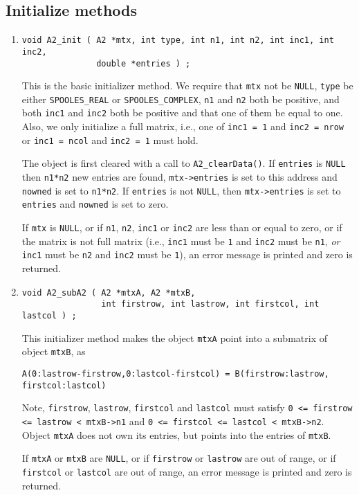 \subsection{Initialize methods}
\label{subsection:A2:proto:initial}
\par
\begin{enumerate}
\item
\begin{verbatim}
void A2_init ( A2 *mtx, int type, int n1, int n2, int inc1, int inc2, 
               double *entries ) ;
\end{verbatim}
This is the basic initializer method.
We require that {\tt mtx} not be {\tt NULL}, 
{\tt type} be either {\tt SPOOLES\_REAL} or {\tt SPOOLES\_COMPLEX},
{\tt n1} and {\tt n2} both be positive, 
and both {\tt inc1} and {\tt inc2} both be
positive and that one of them be equal to one.
Also, we only initialize a full matrix, i.e.,
one of
{\tt inc1 = 1} and {\tt inc2 = nrow}
or
{\tt inc1 = ncol} and {\tt inc2 = 1}
must hold.
\par
The object is first cleared with a call to {\tt A2\_clearData()}.
If {\tt entries} is {\tt NULL} then {\tt n1*n2} new entries 
are found, {\tt mtx->entries} is set to this address and {\tt nowned}
is set to {\tt n1*n2}.
If {\tt entries} is not {\tt NULL}, then {\tt mtx->entries} is set
to {\tt entries} and {\tt nowned} is set to zero.
\par {}
If {\tt mtx} is {\tt NULL},
or if {\tt n1}, {\tt n2}, {\tt inc1} or {\tt inc2} are 
less than or equal to zero,
or if the matrix is not full matrix
(i.e., {\tt inc1} must be {\tt 1} and {\tt inc2} must be {\tt n1},
{\it or}
{\tt inc1} must be {\tt n2} and {\tt inc2} must be {\tt 1}),
an error message is printed and zero is returned.
\item
\begin{verbatim}
void A2_subA2 ( A2 *mtxA, A2 *mtxB, 
                int firstrow, int lastrow, int firstcol, int lastcol ) ;
\end{verbatim}
This initializer method makes the object {\tt mtxA} point into a
submatrix of object {\tt mtxB}, as 
\begin{verbatim}
A(0:lastrow-firstrow,0:lastcol-firstcol) = B(firstrow:lastrow, firstcol:lastcol)
\end{verbatim}
Note, {\tt firstrow}, {\tt lastrow}, {\tt firstcol} and {\tt lastcol}
must satisfy {\tt 0 <= firstrow <= lastrow < mtxB->n1}
and {\tt 0 <= firstcol <= lastcol < mtxB->n2}.
Object {\tt mtxA} does not own its entries, but points into the
entries of {\tt mtxB}.
\par {}
If {\tt mtxA} or {\tt mtxB} are {\tt NULL},
or if {\tt firstrow} or {\tt lastrow} are out of range,
or if {\tt firstcol} or {\tt lastcol} are out of range,
an error message is printed and zero is returned.
\end{enumerate}
\par
